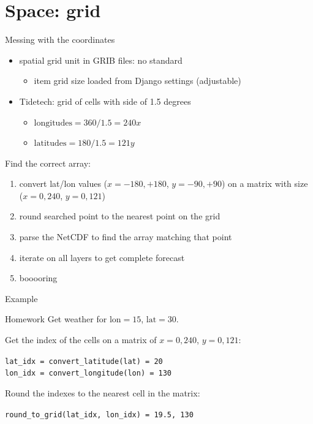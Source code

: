 \documentclass[xcolor=svgnames]{beamer}
\begin{document}

\section{Space: grid}

    \begin{frame}{Messing with the coordinates}
        \begin{itemize}
            \item spatial grid unit in GRIB files: no standard
                \begin{itemize}
                    \item item grid size loaded from Django settings (adjustable)
                \end{itemize}
            \item Tidetech: grid of cells with side of 1.5 degrees
                \begin{itemize}
                    \item $\text{longitudes} = 360/1.5 = 240 x$
                    \item $\text{latitudes} = 180/1.5 = 121 y$
                \end{itemize}
        \end{itemize}
        \pause
        Find the correct array:
        \begin{enumerate}
            \item convert lat/lon values ($x={-180,+180}$, $y={-90,+90}$) on a matrix with size ($x={0,240}$, $y={0,121}$)
            \pause
            \item round searched point to the nearest point on the grid
            \pause
            \item parse the NetCDF to find the array matching that point
            \pause
            \item iterate on all layers to get complete forecast
            \pause
            \item booooring
        \end{enumerate}
    \end{frame}

    \begin{frame}{Example}
        \begin{block}{Homework}
            Get weather for $\text{lon}=15$, $\text{lat}=30$.
        \end{block}
        \vspace{0.05\textheight}
        Get the index of the cells on a matrix of $x={0,240}$, $y={0,121}$:
        \begin{center}
            \texttt{lat\_idx = convert\_latitude(lat) = 20}\\
            \texttt{lon\_idx = convert\_longitude(lon) = 130}
        \end{center}
        Round the indexes to the nearest cell in the matrix:
        \begin{center}
            \texttt{round\_to\_grid(lat\_idx, lon\_idx) = 19.5, 130}
        \end{center}
    \end{frame}
\end{document}
